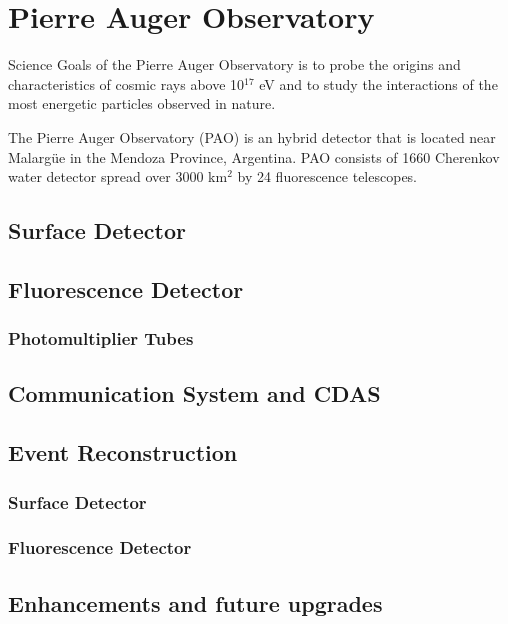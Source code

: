 \chapter{Pierre Auger Observatory}\label{Ch:PAO}


Science Goals of the Pierre Auger Observatory is to probe the origins and characteristics of cosmic rays above 10$^{17}$ eV and to study the interactions of the most energetic particles observed in nature.

The Pierre Auger Observatory (PAO) is an hybrid detector that is located near Malarg\"ue in the Mendoza Province, Argentina. PAO consists of 1660 Cherenkov water detector spread over 3000 km$^2$  by 24 fluorescence telescopes. 


\section{Surface Detector}

\section{Fluorescence Detector}

\subsection{Photomultiplier Tubes}

\section{Communication System and CDAS}

\section{Event Reconstruction}

\subsection{Surface Detector}

\subsection{Fluorescence Detector}

\section{Enhancements and future upgrades}